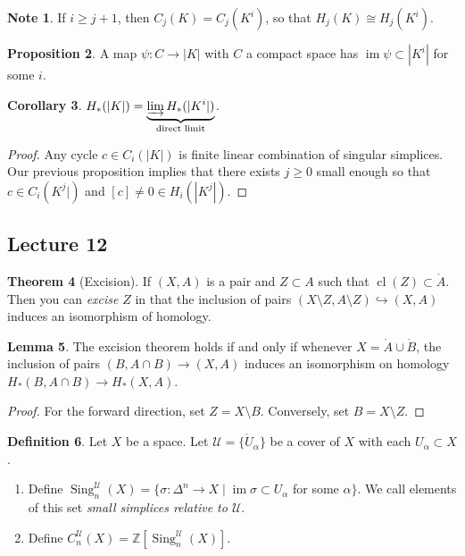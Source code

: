 \documentclass[10pt,letterpaper,cm]{nupset}
\theoremstyle{definition}
\newtheorem{definition}{Definition}[subsection]
\newtheorem{note}[definition]{Note}
\theoremstyle{theorem}
\newtheorem{theorem}[definition]{Theorem}
\newtheorem{lemma}[definition]{Lemma}
\newtheorem{prop}[definition]{Proposition}
\newtheorem{corollary}[definition]{Corollary}
\theoremstyle{remark}
\newcommand{\U}{\mathcal U}
\newcommand{\Z}{\mathbb Z}
\newcommand{\1}{\mathbb{1}}
\newcommand{\0}{\vec 0}
\DeclareMathOperator{\im}{im}
\DeclareMathOperator{\cl}{cl}
\DeclareMathOperator{\sing}{Sing}
\begin{document}
\begin{note}
If $i\geq j+1$, then $C_j(K) = C_j(K^i)$, so that $H_j(K) \cong H_j(K^i)$.
\end{note}

\begin{prop}
A map $\psi : C \to |K|$ with $C$ a compact space has $\im{\psi} \subset |K^i|$ for some $i$.
\end{prop}

\begin{corollary}
$H_{\ast}(|K|) = \underbrace{\varinjlim H_{\ast}(|K^i|)}_{\text{direct limit}}$.
\end{corollary}
\begin{proof}
Any cycle $c\in C_i(|K|)$ is finite linear combination of singular simplices. Our previous proposition implies that there exists $j\geq 0$ small enough so that $c \in  C_i(K^j|)$ and $[c]\ne 0 \in H_i(|K^j|)$.
\end{proof}


\subsection{Lecture 12}

\begin{theorem}[Excision]
If $(X, A)$ is a pair and $Z\subset A$ such that $\cl(Z) \subset \mathring{A}$. Then you can \textit{excise} $Z$ in that the inclusion of pairs $(X\setminus Z, A \setminus Z) \hookrightarrow (X, A)$ induces an isomorphism of homology. 
\end{theorem}

\begin{lemma}\label{l25}
The excision theorem holds if and only if whenever $X= \mathring{A} \cup \mathring{B}$, the inclusion of pairs $(B, A\cap B) \to (X,A)$ induces an isomorphism on homology $H_{\ast}(B, A\cap B) \to H_{\ast}(X,A)$.
\end{lemma}
\begin{proof}
For the forward direction, set $Z= X\setminus B$. Conversely, set $B = X \setminus Z$.
\end{proof}

\begin{definition} Let $X$ be a space. Let $\mathcal{U} =\{\mathring{U}_{\alpha}\}$ be a cover of $X$ with each $U_{\alpha} \subset X$.
\begin{enumerate}
\item Define $\sing_n^{\U}(X) =\{\sigma : \Delta^n  \to X \mid \im{\sigma}\subset U_{\alpha}$ for some $\alpha\}$. We call elements of this set \textit{small simplices relative to $\U$}.
\item Define  $C_n^{\U}(X) =\Z[\sing_n^{\U}(X)]$.
\end{enumerate}
\end{definition}
\end{document}
